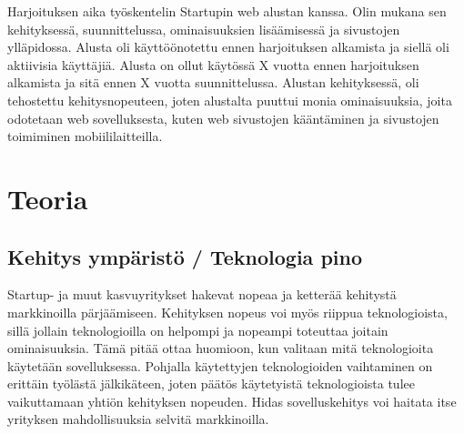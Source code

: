 \documentclass[11pt,a4paper,titlepage,oneside]{article}
\begin{document}
Harjoituksen aika työskentelin Startupin web alustan kanssa. 
Olin mukana sen kehityksessä, suunnittelussa, ominaisuuksien lisäämisessä ja sivustojen ylläpidossa.
Alusta oli käyttöönotettu ennen harjoituksen alkamista ja siellä oli aktiivisia käyttäjiä.
Alusta on ollut käytössä X vuotta ennen harjoituksen alkamista ja sitä ennen X vuotta suunnittelussa.
Alustan kehityksessä, oli tehostettu kehitysnopeuteen,
joten alustalta puuttui monia ominaisuuksia, joita odotetaan web sovelluksesta, 
kuten web sivustojen kääntäminen ja sivustojen toimiminen mobiililaitteilla.
\medskip

























\newpage
\section{Teoria}                %



\subsection{Kehitys ympäristö / Teknologia pino}




Startup- ja muut kasvuyritykset hakevat nopeaa ja ketterää kehitystä markkinoilla pärjäämiseen.
Kehityksen nopeus voi myös riippua teknologioista, sillä jollain teknologioilla on helpompi ja nopeampi toteuttaa joitain ominaisuuksia.
Tämä pitää ottaa huomioon, kun valitaan mitä teknologioita käytetään sovelluksessa.
Pohjalla käytettyjen teknologioiden vaihtaminen on erittäin työlästä jälkikäteen,
joten päätös käytetyistä teknologioista tulee vaikuttamaan yhtiön kehityksen nopeuden.
Hidas sovelluskehitys voi haitata itse yrityksen mahdollisuuksia selvitä markkinoilla.
\medskip
\end{document}
